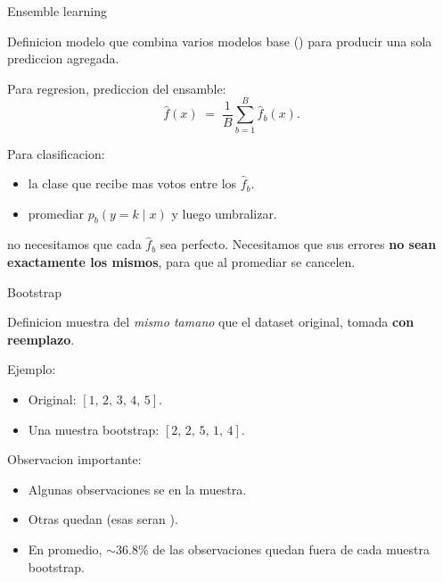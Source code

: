 \begin{frame}{Ensemble learning}
\begin{block}{Definicion}
\small
{} modelo que combina varios modelos base () para producir una sola prediccion agregada.
\end{block}

\vspace{0.3em}
Para regresion, prediccion del ensamble:
\[
\hat f(x) \;=\; \frac{1}{B}\sum_{b=1}^{B} \hat f_b(x).
\]

\vspace{0.2em}
Para clasificacion:
\begin{itemize}\small
  \item {} la clase que recibe mas votos entre los $\hat f_b$.
  \item {} promediar $p_b(y=k\mid x)$ y luego umbralizar.
\end{itemize}

\vspace{0.25em}
 no necesitamos que cada $\hat f_b$ sea perfecto. Necesitamos que sus errores \textbf{no sean exactamente los mismos}, para que al promediar se cancelen.
\end{frame}

\begin{frame}{Bootstrap}
\begin{block}{Definicion}
\small
{} muestra del \emph{mismo tamano} que el dataset original, tomada \textbf{con reemplazo}.
\end{block}

\vspace{0.3em}
Ejemplo:
\begin{itemize}\small
  \item Original: $[1,\,2,\,3,\,4,\,5]$.
  \item Una muestra bootstrap: $[2,\,2,\,5,\,1,\,4]$.
\end{itemize}

\vspace{0.3em}
Observacion importante:
\begin{itemize}\small
  \item Algunas observaciones se  en la muestra.
  \item Otras quedan  (esas seran ).
  \item En promedio, $\sim$36.8\% de las observaciones quedan fuera de cada muestra bootstrap.
\end{itemize}
\end{frame}

